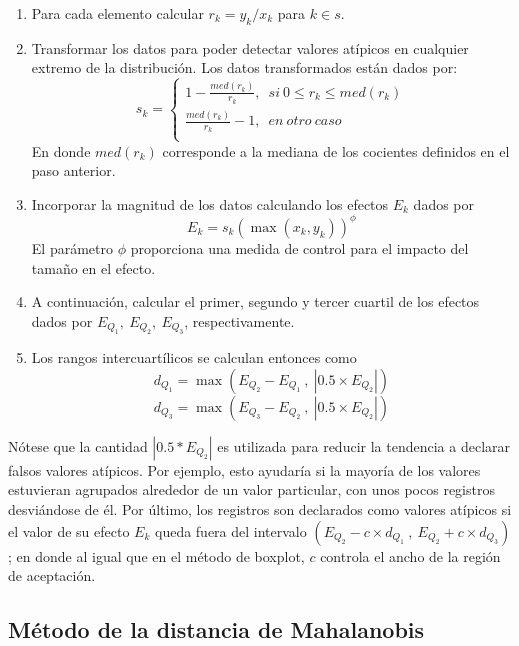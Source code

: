 \documentclass[
  12pt,
]{book}
\providecommand{\tightlist}{%
  \setlength{\itemsep}{0pt}\setlength{\parskip}{0pt}}
\begin{document}
\begin{enumerate}
\def\labelenumi{\arabic{enumi}.}
\tightlist
\item
  Para cada elemento calcular \(r_k=y_k/x_k\) para \(k\in s\).
\item
  Transformar los datos para poder detectar valores atípicos en cualquier extremo de la distribución. Los datos transformados están dados por:
  \[s_k=\left\{\begin{matrix}1-\frac{med(r_k)}{r_k},\;\ si\ 0\le r_k\le m e d(r_k)\\\frac{med(r_k)}{r_k}-1,\;\ en \ otro \ caso\\\end{matrix}\right.\] En donde \(med(r_k)\) corresponde a la mediana de los cocientes definidos en el paso anterior.\\
\item
  Incorporar la magnitud de los datos calculando los efectos \(E_k\) dados por
  \[
  E_k = s_k  \left( \max(x_k,y_k) \right)^\phi
  \]
  El parámetro \(\phi\) proporciona una medida de control para el impacto del tamaño en el efecto.
\item
  A continuación, calcular el primer, segundo y tercer cuartil de los efectos dados por \(E_{Q_1}, \ E_{Q_2}, \ E_{Q_3}\), respectivamente.
\item
  Los rangos intercuartílicos se calculan entonces como
  \[
  d_{Q_1} = \max\left(E_{Q_2} - E_{Q_1}\ , \ |0.5 \times E_{Q_2}|\right)
  \]
  \[
  d_{Q_3} = \max\left(E_{Q_3} - E_{Q_2}\ , \ |0.5 \times E_{Q_2}|\right) 
  \]
\end{enumerate}

Nótese que la cantidad \(|0.5*E_{Q_2}|\) es utilizada para reducir la tendencia a declarar falsos valores atípicos. Por ejemplo, esto ayudaría si la mayoría de los valores estuvieran agrupados alrededor de un valor particular, con unos pocos registros desviándose de él. Por último, los registros son declarados como valores atípicos si el valor de su efecto \(E_k\) queda fuera del intervalo \((E_{Q_2} - c \times d_{Q_1} \ , \ E_{Q_2} + c \times d_{Q_3})\); en donde al igual que en el método de boxplot, \(c\) controla el ancho de la región de aceptación.

\hypertarget{muxe9todo-de-la-distancia-de-mahalanobis}{%
\subsection{Método de la distancia de Mahalanobis}\label{muxe9todo-de-la-distancia-de-mahalanobis}}
\end{document}

